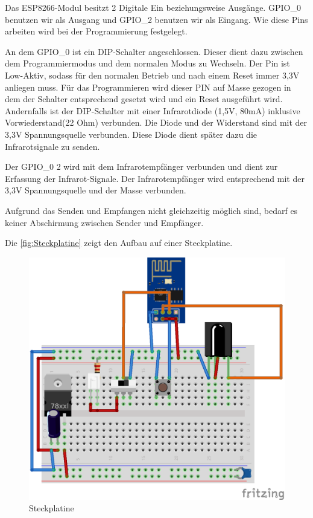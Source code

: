 Das ESP8266-Modul besitzt 2 Digitale Ein beziehungsweise Ausgänge. GPIO\_0 benutzen wir als Ausgang und GPIO\_2 benutzen wir als Eingang.
Wie diese Pins arbeiten wird bei der Programmierung festgelegt.

An dem GPIO\_0 ist ein DIP-Schalter angeschlossen.
Dieser dient dazu zwischen dem Programmiermodus und dem normalen Modus zu Wechseln.
Der Pin ist Low-Aktiv, sodass für den normalen Betrieb und nach einem Reset immer 3,3V anliegen muss.
Für das Programmieren wird dieser PIN auf Masse gezogen in dem der Schalter entsprechend gesetzt wird und ein Reset ausgeführt wird.
Andernfalls ist der DIP-Schalter mit einer Infrarotdiode (1,5V, 80mA) inklusive Vorwiederstand(22 Ohm) verbunden.
Die Diode und der Widerstand sind mit der 3,3V Spannungsquelle verbunden.
Diese Diode dient später dazu die Infrarotsignale zu senden.

Der GPIO\_0 2 wird mit dem Infrarotempfänger verbunden und dient zur Erfassung der Infrarot-Signale.
Der Infrarotempfänger wird entsprechend mit der 3,3V Spannungsquelle und der Masse verbunden.

Aufgrund das Senden und Empfangen nicht gleichzeitig möglich sind, bedarf es keiner Abschirmung zwischen Sender und Empfänger.

Die \autoref{fig:Steckplatine} zeigt den Aufbau auf einer Steckplatine.

\begin{figure}
	\centering
	\includegraphics[scale=1]{Abbildungen/ESP8266_Steckplatine}
	\caption{Steckplatine}
	\label{fig:Steckplatine}
\end{figure}



